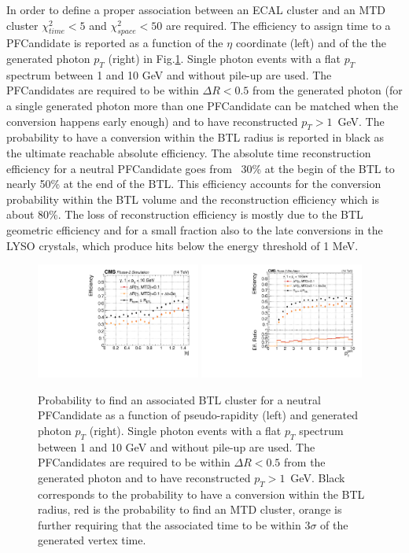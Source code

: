 
In order to define a proper association between an ECAL cluster and an MTD cluster $\chi^{2}_{time}<5$ and  $\chi^{2}_{space}<50$ are required.
The efficiency to assign time to a PFCandidate is reported as a function of the $\eta$ coordinate (left) and of the the generated photon $p_{T}$ (right) in Fig.\ref{fig:neu_eff_PU0}. Single photon events with a flat $p_{T}$ spectrum between 1 and 10 GeV and without pile-up are used. The PFCandidates are required to be within $\Delta R<0.5$ from the generated photon (for a single generated photon more than one PFCandidate can be matched when the conversion happens early enough) and to have reconstructed $p_{T}>1$~GeV. 
The probability to have a conversion within the BTL radius is reported in black as the ultimate reachable absolute efficiency. The absolute time reconstruction efficiency for a neutral PFCandidate goes from ~30\% at the begin of the BTL to nearly 50\% at the end of the BTL. This efficiency accounts for the conversion probability within the BTL volume and the reconstruction efficiency which is about 80\%. The loss of reconstruction efficiency is mostly due to the BTL geometric efficiency and for a small fraction also to the late conversions in the LYSO crystals, which produce hits below the energy threshold of 1 MeV.

\begin{figure}[!hbtp]
\centering
\includegraphics[width=0.48\textwidth]{fig/performance/neutrals/neutrals_efficiency_vs_eta.pdf}
\includegraphics[width=0.48\textwidth]{fig/performance/neutrals/neutrals_efficiency_vs_genPt_minDR0p1.pdf}
\caption{Probability to find an associated BTL cluster for a neutral PFCandidate as a function of pseudo-rapidity (left) and generated photon $p_{T}$ (right). Single photon events with a flat $p_{T}$ spectrum between 1 and 10 GeV and without pile-up are used. The PFCandidates are required to be within $\Delta R<0.5$ from the generated photon and to have reconstructed $p_{T}>1$~GeV. Black corresponds to the probability to have a conversion within the BTL radius, red is the probability to find an MTD cluster, orange is further requiring that the associated time to be within $3\sigma$ of the generated vertex time.}
\label{fig:neu_eff_PU0}
\end{figure}

